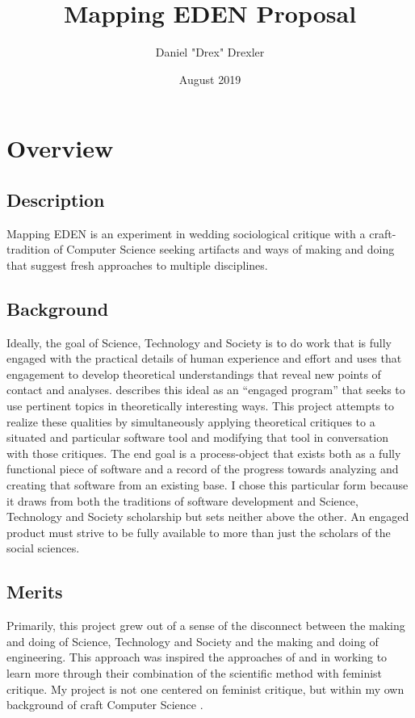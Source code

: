 \documentclass[a4paper,man,natbib]{apa6}
\title{Mapping EDEN Proposal}
\author{Daniel "Drex" Drexler}
\affiliation{Center for Science, Technology and Society at Drexel University}
\date{August 2019}
\begin{document}
   \maketitle
   \clearpage

   \section*{Overview}
   \subsection*{Description}
   Mapping EDEN is an experiment in wedding sociological critique with a craft-tradition of Computer Science seeking artifacts and ways of making and doing that suggest fresh approaches to multiple disciplines.
   \subsection*{Background}
   Ideally, the goal of Science, Technology and Society is to do work that is fully engaged with the practical details of human experience and effort and uses that engagement to develop theoretical understandings that reveal new points of contact and analyses. \citet{Sismondo2008-xz} describes this ideal as an “engaged program” that seeks to use pertinent topics in theoretically interesting ways. This project attempts to realize these qualities by simultaneously applying theoretical critiques to a situated and particular software tool and modifying that tool in conversation with those critiques. The end goal is a process-object that exists both as a fully functional piece of software and a record of the progress towards analyzing and creating that software from an existing base. I chose this particular form because it draws from both the traditions of software development and Science, Technology and Society scholarship but sets neither above the other. An engaged product must strive to be fully available to more than just the scholars of the social sciences.
   \subsection*{Merits}
   Primarily, this project grew out of a sense of the disconnect between the making and doing of Science, Technology and Society and the making and doing of engineering. This approach was inspired the approaches of \citet{Roy2018-ma} and \citet{Subramaniam2014-wg} in working to learn more through their combination of the scientific method with feminist critique. My project is not one centered on feminist critique, but within my own background of craft Computer Science \citep[see][]{Ensmenger2012-kz}. 
\end{document}
